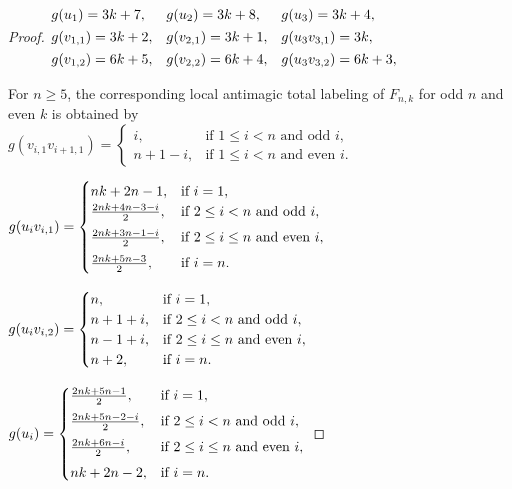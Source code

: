 \documentclass[12pt]{article}
\begin{document}
\begin{proof}
$\hspace{-0.5em}\begin{array}{lll}
g(u_{1})=3k+7,&g(u_{2})=3k+8,&g(u_{3})=3k+4,\\[4pt]
g(v_{1,1})=3k+2,&g(v_{2,1})=3k+1,&g(u_{3}v_{3,1})=3k,\\[4pt]
g(v_{1,2})=6k+5,&g(v_{2,2})=6k+4,&g(u_{3}v_{3,2})=6k+3,
\end{array}$\vspace{0.6em}

For $n\geq 5$, the corresponding local antimagic total labeling of $F_{n,k}$ for odd $n$ and even $k$ is obtained by\\

$g(v_{i,1}v_{i+1,1})=\begin{cases}
i, & \text{if $1\leq i<n$ and odd $i$},\\
n+1-i, &\text{if $1\leq i<n$ and even $i$}.\end{cases}$\vspace{0.5em}

$g(u_{i}v_{i,1})=\begin{cases}
nk+2n-1, & \text{if $ i=1$},\\
\frac{2nk+4n-3-i}{2},& \text{if $2\leq i< n$ and odd $i$},\\[4pt]
\frac{2nk+3n-1-i}{2}, &\text{if $2\leq i\leq n$ and even $i$},\\[4pt]
\frac{2nk+5n-3}{2}, & \text{if $i=n$}.\end{cases}$\vspace{0.5em}

$g(u_{i}v_{i,2})=\begin{cases}
n, & \text{if $ i=1$},\\
n+1+i, & \text{if $2\leq i< n$ and odd $i$},\\
n-1+i,  &\text{if $2\leq i\leq n$ and even $i$},\\
n+2, & \text{if $ i=n$}.\end{cases}$\vspace{0.5em}

$g(u_{i})=\begin{cases}
\frac{2nk+5n-1}{2}, & \text{if $ i=1$},\\[4pt]
\frac{2nk+5n-2-i}{2},& \text{if $2\leq i< n$ and odd $i$},\\[4pt]
\frac{2nk+6n-i}{2}, &\text{if $2\leq i\leq n$ and even $i$},\\[4pt]
nk+2n-2, & \text{if $ i=n$}.\end{cases}$\vspace{0.5em}


\end{proof}
\end{document}
